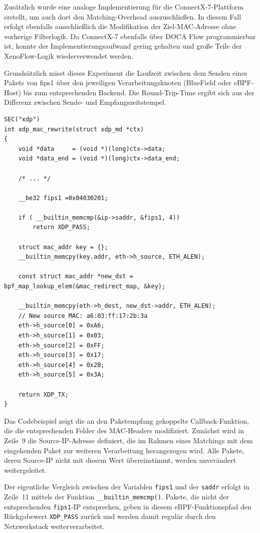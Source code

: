 \documentclass[paper=a4, fontsize=11pt]{scrartcl} %
\numberwithin{equation}{section} %
\numberwithin{figure}{section} %
\numberwithin{table}{section} %
\begin{document}
Zusätzlich wurde eine analoge Implementierung für die ConnectX-7-Plattform erstellt, um auch dort den Matching-Overhead auszuschließen. In diesem Fall erfolgt ebenfalls ausschließlich die Modifikation der Ziel-MAC-Adresse ohne vorherige Filterlogik. Da ConnectX-7 ebenfalls über DOCA Flow programmierbar ist, konnte der Implementierungsaufwand gering gehalten und große Teile der XenoFlow-Logik wiederverwendet werden.

Grundsätzlich misst dieses Experiment die Laufzeit zwischen dem Senden eines Pakets von fips1 über den jeweiligen Verarbeitungsknoten (BlueField oder eBPF-Host) bis zum entsprechenden Backend. Die Round-Trip-Time ergibt sich aus der Differenz zwischen Sende- und Empfangszeitstempel.
\label{code:ebpf-code}
\begin{verbatim}
SEC("xdp")
int xdp_mac_rewrite(struct xdp_md *ctx)
{
    void *data     = (void *)(long)ctx->data;
    void *data_end = (void *)(long)ctx->data_end;

    /* ... */

    __be32 fips1 =0x04030201;

    if ( __builtin_memcmp(&ip->saddr, &fips1, 4)) 
        return XDP_PASS;

    struct mac_addr key = {};
    __builtin_memcpy(key.addr, eth->h_source, ETH_ALEN);

    const struct mac_addr *new_dst = bpf_map_lookup_elem(&mac_redirect_map, &key);

    __builtin_memcpy(eth->h_dest, new_dst->addr, ETH_ALEN);
    // New source MAC: a6:03:ff:17:2b:3a
    eth->h_source[0] = 0xA6;
    eth->h_source[1] = 0x03;
    eth->h_source[2] = 0xFF;
    eth->h_source[3] = 0x17;
    eth->h_source[4] = 0x2B;
    eth->h_source[5] = 0x3A;

    return XDP_TX;
}
\end{verbatim}
Das Codebeispiel zeigt die an den Paketempfang gekoppelte Callback-Funktion, die die entsprechenden Felder des MAC-Headers modifiziert. Zunächst wird in Zeile~9 die Source-IP-Adresse definiert, die im Rahmen eines Matchings mit dem eingehenden Paket zur weiteren Verarbeitung herangezogen wird. Alle Pakete, deren Source-IP nicht mit diesem Wert übereinstimmt, werden unverändert weitergeleitet.

Der eigentliche Vergleich zwischen der Variablen \texttt{fips1} und der \texttt{saddr} erfolgt in Zeile~11 mittels der Funktion \texttt{\_\_builtin\_memcmp()}. Pakete, die nicht der entsprechenden \texttt{fips1}-IP entsprechen, geben in diesem eBPF-Funktionspfad den Rückgabewert \texttt{XDP\_PASS} zurück und werden damit regulär durch den Netzwerkstack weiterverarbeitet.
\end{document}
